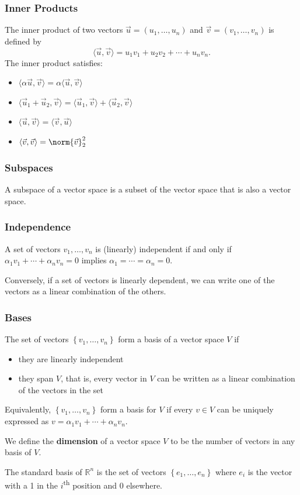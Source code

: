 \documentclass[11pt]{article}
\begin{document}
\subsubsection*{Inner Products}
The inner product of two vectors $\vec{u} = (u_1, \ldots, u_n)$ and $\vec{v} = (v_1, \ldots, v_n)$ is defined by 
\[ \langle \vec{u}, \vec{v} \rangle = u_1v_1 + u_2v_2 + \cdots + u_nv_n. \] 
The inner product satisfies:
\begin{itemize}
    \item $\langle \alpha\vec{u}, \vec{v} \rangle = \alpha\langle \vec{u}, \vec{v} \rangle$
    \item $\langle \vec{u}_1 + \vec{u}_2, \vec{v} \rangle = \langle \vec{u}_1, \vec{v} \rangle + \langle \vec{u}_2, \vec{v} \rangle$
    \item $\langle \vec{u}, \vec{v} \rangle = \langle \vec{v}, \vec{u} \rangle$
    \item $\langle \vec{v}, \vec{v} \rangle = \norm{\vec{v}}_2^2$
\end{itemize}

\subsubsection*{Subspaces} 
A subspace of a vector space is a subset of the vector space that is also a vector space. \par
\subsubsection*{Independence}
A set of vectors $v_1, \ldots, v_n$ is (linearly) independent if and only if $\alpha_1v_1 + \cdots + \alpha_nv_n = 0$ implies $\alpha_1 = \cdots = \alpha_n = 0$. \par 
Conversely, if a set of vectors is linearly dependent, we can write one of the vectors as a linear combination of the others. \par
\subsubsection*{Bases}
The set of vectors $\left\{ v_1, \ldots, v_n \right\}$ form a basis of a vector space $V$ if 
\begin{itemize}
    \item they are linearly independent
    \item they span $V$, that is, every vector in $V$ can be written as a linear combination of the vectors in the set
\end{itemize}  
Equivalently, $\left\{ v_1, \ldots, v_n \right\}$ form a basis for $V$ if every $v \in V$ can be uniquely expressed as $v = \alpha_1v_1 + \cdots + \alpha_nv_n$. \par
We define the \textbf{dimension} of a vector space $V$ to be the number of vectors in any basis of $V$. \par
The standard basis of $\mathbb{R}^n$ is the set of vectors $\left\{ e_1, \ldots, e_n \right\}$ where $e_i$ is the vector with a 1 in the $i$\textsuperscript{th} position and 0 elsewhere. \par
\end{document}
